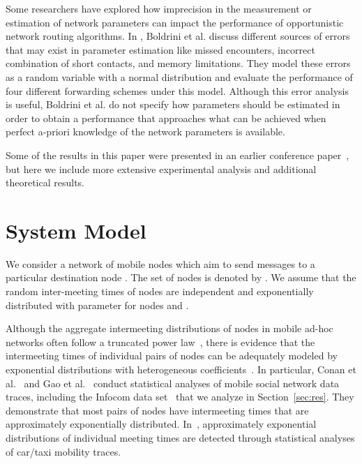 \documentclass[journal,onecolumn,11pt]{IEEEtran}
\theoremstyle{plain}
\theoremstyle{definition}
\begin{document}
Some researchers have explored how imprecision in the measurement
or estimation of network parameters can impact the performance of
opportunistic network routing algorithms. In \cite
{boldrini2010modelling, boldrini2012performance}, Boldrini
et al. discuss different sources of errors that may exist in parameter
estimation like missed encounters, incorrect combination of short
contacts, and memory limitations. They model these errors
as a random variable with a normal distribution and evaluate the
performance of four different forwarding schemes under this
model. Although this error analysis is useful, Boldrini et al. do not
specify how parameters should be estimated in order to obtain a
performance that approaches what can be achieved when perfect a-priori
knowledge of the network parameters is available.

Some of the results in this paper were presented in an earlier
conference paper~\cite{shaghaghian2014opportunistic}, but here we include more extensive experimental
analysis and additional theoretical results.

\section{System Model} \label{sec:system_model}
We consider a network of  mobile nodes which aim to send messages
to a particular destination node . The set of nodes is denoted by
. We assume that the random inter-meeting times of nodes
are independent and exponentially distributed with parameter
 for nodes  and . 

Although the aggregate intermeeting distributions of nodes in mobile
ad-hoc networks often follow a truncated power
law~\cite{cai2009,chaintreau2007impact}, there is evidence that the
intermeeting times of individual pairs of nodes can be adequately
modeled by exponential distributions with heterogeneous
coefficients~\cite{conan2007,gao2009,lee2010,zhu2010}. In particular,
Conan et al.~\cite{conan2007} and Gao et al.~\cite{gao2009} conduct
statistical analyses of mobile social network data traces, including
the Infocom data set~\cite{cambridge-haggle-2006-01-31} that we
analyze in Section~\ref{sec:res}. They demonstrate that most pairs of
nodes have intermeeting times that are approximately exponentially
distributed. In~\cite{lee2010,zhu2010}, approximately exponential
distributions of individual meeting times are detected through
statistical analyses of car/taxi mobility traces.
\end{document}
